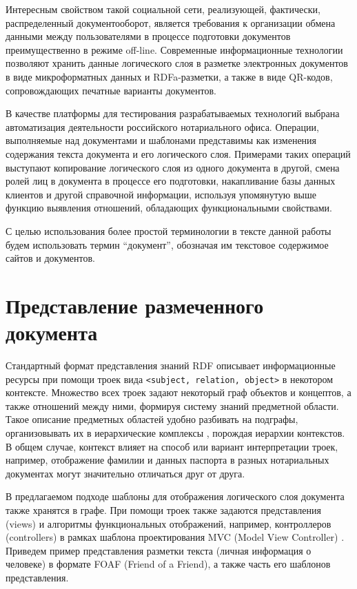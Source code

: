 \documentclass[utf8]{../IncArticle}
\begin{document}
Интересным свойством такой социальной сети, реализующей, фактически,
распределенный документооборот, является требования к организации
обмена данными между пользователями в процессе подготовки документов
преимущественно в режиме off-line.  Современные информационные
технологии позволяют хранить данные логического слоя в разметке
электронных документов в виде микроформатных данных и RDFa-разметки, а
также в виде QR-кодов, сопровождающих печатные варианты документов.

В качестве платформы для тестирования разрабатываемых технологий
выбрана автоматизация деятельности российского нотариального
офиса.  Операции, выполняемые над документами и шаблонами представимы
как изменения содержания текста документа и его логического
слоя.  Примерами таких операций выступают копирование логического слоя
из одного документа в другой, смена ролей лиц в документа в процессе
его подготовки, накапливание базы данных клиентов и другой справочной
информации, используя упомянутую выше функцию выявления отношений,
обладающих функциональными свойствами.

С целью использования более
простой терминологии в тексте данной работы будем использовать термин
``документ'', обозначая им текстовое содержимое сайтов и документов.

\section{Представление размеченного документа}

Стандартный формат представления знаний RDF описывает информационные
ресурсы при помощи троек вида \texttt{<subject, relation, object>} в
некотором контексте.  Множество всех троек задают некоторый граф
объектов и концептов, а также отношений между ними, формируя
систему знаний предметной области.  Такое описание предметных областей
удобно разбивать на подграфы, организовывать их в иерархические
комплексы \cite{b2:15}, порождая иерархии контекстов.  В общем случае,
контекст влияет на способ или вариант интерпретации троек, например,
отображение фамилии и данных паспорта в разных нотариальных документах
могут значительно отличаться друг от друга.

В предлагаемом подходе \cite{zont2013} шаблоны для отображения
логического слоя документа также хранятся в графе.  При помощи троек
также задаются представления (views) и алгоритмы функциональных
отображений, например, контроллеров (controllers) в рамках шаблона
проектирования MVC (Model View Controller) \cite{b2:5}.  Приведем
пример представления разметки текста (личная информация о человеке) в
формате FOAF (Friend of a Friend), а также часть его шаблонов
представления.
\end{document}
